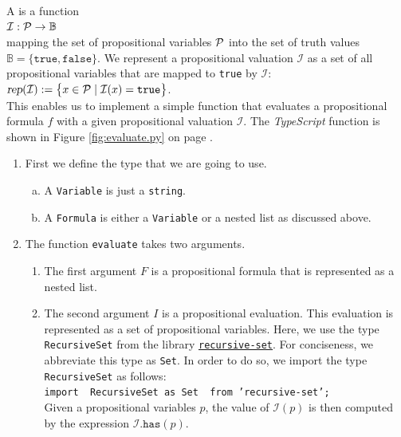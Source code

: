 A  is a function  
\\[0.2cm]
\hspace*{1.3cm} ${\cal I}: {\cal P} \rightarrow \mathbb{B}$ \\[0.2cm]
mapping the set of propositional variables ${\cal P}$ into the set of truth values
$\mathbb{B} = \bigl\{ \mathtt{true}, \mathtt{false} \bigr\}$.
We represent a propositional valuation $\mathcal{I}$ as a set of all propositional variables that are mapped
to \texttt{true} by $\mathcal{I}$:
\\[0.2cm]
\hspace*{1.3cm}
$\textsl{rep}(\mathcal{I}) := \bigl\{ x \in \mathcal{P} \mid \mathcal{I}(x) = \texttt{true} \bigr\}$.
\\[0.2cm]
This enables us to implement a simple function that evaluates a propositional formula $f$ with a given
propositional valuation $\mathcal{I}$.
The \textsl{TypeScript} function  is shown in Figure \ref{fig:evaluate.py} on page
\pageref{fig:evaluate.py}. 

\begin{enumerate}
\item First we define the type that we are going to use.
      \begin{enumerate}[(a)]
      \item A \texttt{Variable} is just a \texttt{string}.
      \item A \texttt{Formula} is either a \texttt{Variable} or a nested list as discussed above.
      \end{enumerate}
\item The function \texttt{evaluate} takes two arguments.
      \begin{enumerate}
      \item The first argument $F$ is a propositional formula that is represented as a nested list.
      \item The second argument $I$ is a propositional evaluation.  This evaluation is represented as a set of
        propositional variables. Here, we use the type \texttt{RecursiveSet} from the library
        \href{https://github.com/cstrerath/recursive-set}{\texttt{recursive-set}}.  For conciseness,  we abbreviate
        this type as \texttt{Set}.  In order to do so, we import the type \texttt{RecursiveSet} as follows:
        \\[0.2cm]
        \hspace*{1.3cm}
        \texttt{import { RecursiveSet as Set } from 'recursive-set';}
        \\[0.2cm]
        Given a propositional variables $p$, the value of $\mathcal{I}(p)$ is then computed
        by the expression  $\mathcal{I}\mathtt{.has}(p)$.
      \end{enumerate}
\end{enumerate}

